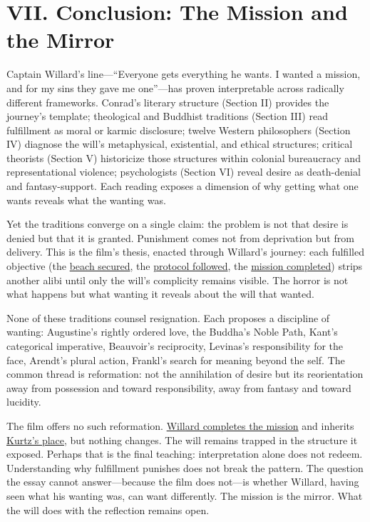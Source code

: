 \section*{VII. Conclusion: The Mission and the Mirror}
\label{sec:vii-conclusion}

Captain Willard's line---``Everyone gets everything he wants. I wanted a mission, and for my
sins they gave me one''---has proven interpretable across radically different frameworks.
Conrad's literary structure (Section II) provides the journey's template; theological and
Buddhist traditions (Section III) read fulfillment as moral or karmic disclosure; twelve
Western philosophers (Section IV) diagnose the will's metaphysical, existential, and ethical
structures; critical theorists (Section V) historicize those structures within colonial
bureaucracy and representational violence; psychologists (Section VI) reveal desire as
death-denial and fantasy-support. Each reading exposes a dimension of why getting what one
wants reveals what the wanting was.

Yet the traditions converge on a single claim: the problem is not that desire is denied but
that it is granted. Punishment comes not from deprivation but from delivery. This is the
film's thesis, enacted through Willard's journey: each fulfilled objective (the
\hyperref[scene:kilgore-beach]{beach secured}, the \hyperref[scene:sampan]{protocol followed},
the \hyperref[scene:assassination]{mission completed}) strips another alibi until only the
will's complicity remains visible. The horror is not what happens but what wanting it reveals about
the will that wanted.

None of these traditions counsel resignation. Each proposes a discipline of wanting: Augustine's
rightly ordered love, the Buddha's Noble Path, Kant's categorical imperative, Beauvoir's
reciprocity, Levinas's responsibility for the face, Arendt's plural action, Frankl's search
for meaning beyond the self. The common thread is reformation: not the annihilation of desire
but its reorientation away from possession and toward responsibility, away from fantasy and
toward lucidity.

The film offers no such reformation. \hyperref[scene:assassination]{Willard completes the
	mission} and inherits \hyperref[scene:kurtz-compound]{Kurtz's place}, but nothing changes. The
will remains trapped in the structure it exposed. Perhaps that is the
final teaching: interpretation alone does not redeem. Understanding why fulfillment punishes
does not break the pattern. The question the essay cannot answer---because the film does
not---is whether Willard, having seen what his wanting was, can want differently. The mission
is the mirror. What the will does with the reflection remains open.
